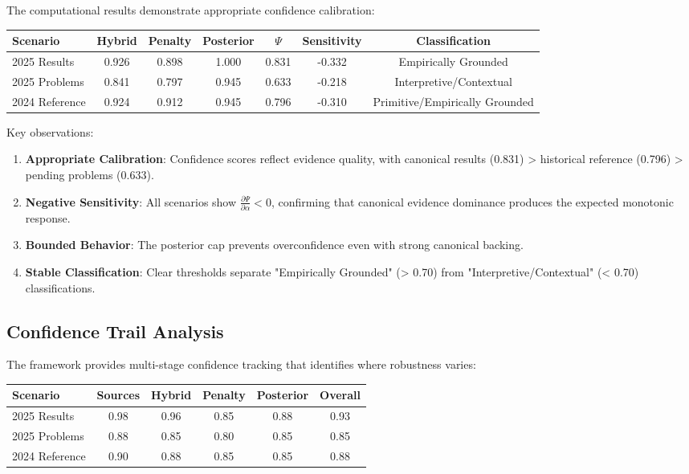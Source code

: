 \documentclass[12pt,a4paper]{article}
\newcommand{\alloc}{\alpha}
\newcommand{\score}{\Psi}
\begin{document}
The computational results demonstrate appropriate confidence calibration:

\begin{center}
\begin{tabular}{@{}lcccccc@{}}
\toprule
Scenario & Hybrid & Penalty & Posterior & $\score$ & Sensitivity & Classification \\
\midrule
2025 Results & 0.926 & 0.898 & 1.000 & 0.831 & -0.332 & Empirically Grounded \\
2025 Problems & 0.841 & 0.797 & 0.945 & 0.633 & -0.218 & Interpretive/Contextual \\
2024 Reference & 0.924 & 0.912 & 0.945 & 0.796 & -0.310 & Primitive/Empirically Grounded \\
\bottomrule
\end{tabular}
\end{center}

Key observations:

\begin{enumerate}
\item \textbf{Appropriate Calibration}: Confidence scores reflect evidence quality, with canonical results (0.831) > historical reference (0.796) > pending problems (0.633).

\item \textbf{Negative Sensitivity}: All scenarios show $\frac{\partial \score}{\partial \alloc} < 0$, confirming that canonical evidence dominance produces the expected monotonic response.

\item \textbf{Bounded Behavior}: The posterior cap prevents overconfidence even with strong canonical backing.

\item \textbf{Stable Classification}: Clear thresholds separate "Empirically Grounded" (> 0.70) from "Interpretive/Contextual" (< 0.70) classifications.
\end{enumerate}

\subsection{Confidence Trail Analysis}

The framework provides multi-stage confidence tracking that identifies where robustness varies:

\begin{center}
\begin{tabular}{@{}lccccc@{}}
\toprule
Scenario & Sources & Hybrid & Penalty & Posterior & Overall \\
\midrule
2025 Results & 0.98 & 0.96 & 0.85 & 0.88 & 0.93 \\
2025 Problems & 0.88 & 0.85 & 0.80 & 0.85 & 0.85 \\
2024 Reference & 0.90 & 0.88 & 0.85 & 0.85 & 0.88 \\
\bottomrule
\end{tabular}
\end{center}
\end{document}
